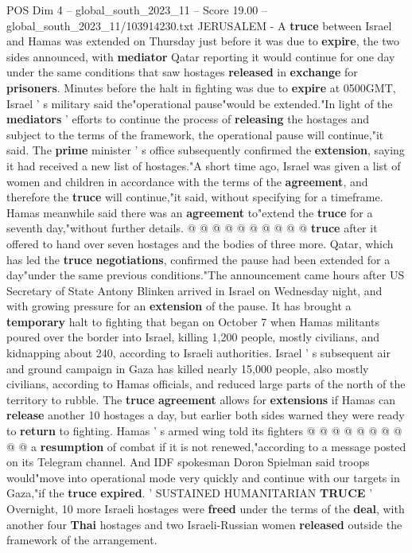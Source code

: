 \begin{textsample}{POS Dim 4 – global\_south\_2023\_11 – Score 19.00 – global\_south\_2023\_11/103914230.txt}  \label{ex:f4_pos_157}
JERUSALEM - A \textbf{truce} between Israel and Hamas was extended on Thursday just before it was due to \textbf{expire}, the two sides announced, with \textbf{mediator} Qatar reporting it would continue for one day under the same conditions that saw hostages \textbf{released} in \textbf{exchange} for \textbf{prisoners}.
Minutes before the halt in fighting was due to \textbf{expire} at 0500GMT, Israel ' s military said the"operational pause"would be extended."In light of the \textbf{mediators} ' efforts to continue the process of \textbf{releasing} the hostages and subject to the terms of the framework, the operational pause will continue,"it said.
The \textbf{prime} minister ' s office subsequently confirmed the \textbf{extension}, saying it had received a new list of hostages."A short time ago, Israel was given a list of women and children in accordance with the terms of the \textbf{agreement}, and therefore the \textbf{truce} will continue,"it said, without specifying for a timeframe.
Hamas meanwhile said there was an \textbf{agreement} to"extend the \textbf{truce} for a seventh day,"without further details. @ @ @ @ @ @ @ @ @ @ \textbf{truce} after it offered to hand over seven hostages and the bodies of three more.
Qatar, which has led the \textbf{truce} \textbf{negotiations}, confirmed the pause had been extended for a day"under the same previous conditions."The announcement came hours after US Secretary of State Antony Blinken arrived in Israel on Wednesday night, and with growing pressure for an \textbf{extension} of the pause.
It has brought a \textbf{temporary} halt to fighting that began on October 7 when Hamas militants poured over the border into Israel, killing 1,200 people, mostly civilians, and kidnapping about 240, according to Israeli authorities.
Israel ' s subsequent air and ground campaign in Gaza has killed nearly 15,000 people, also mostly civilians, according to Hamas officials, and reduced large parts of the north of the territory to rubble.
The \textbf{truce} \textbf{agreement} allows for \textbf{extensions} if Hamas can \textbf{release} another 10 hostages a day, but earlier both sides warned they were ready to \textbf{return} to fighting.
Hamas ' s armed wing told its fighters @ @ @ @ @ @ @ @ @ @ a \textbf{resumption} of combat if it is not renewed,"according to a message posted on its Telegram channel.
And IDF spokesman Doron Spielman said troops would"move into operational mode very quickly and continue with our targets in Gaza,"if the \textbf{truce} \textbf{expired}. ' SUSTAINED HUMANITARIAN \textbf{TRUCE} ' Overnight, 10 more Israeli hostages were \textbf{freed} under the terms of the \textbf{deal}, with another four \textbf{Thai} hostages and two Israeli-Russian women \textbf{released} outside the framework of the arrangement.

\end{textsample}
